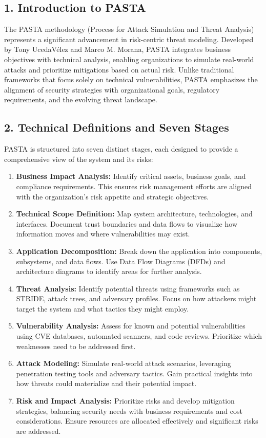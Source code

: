

\subsection*{1. Introduction to PASTA}
The PASTA methodology (Process for Attack Simulation and Threat Analysis) represents a significant advancement in risk-centric threat modeling. Developed by Tony UcedaVélez and Marco M. Morana\cite{uceda2015}, PASTA integrates business objectives with technical analysis, enabling organizations to simulate real-world attacks and prioritize mitigations based on actual risk. Unlike traditional frameworks that focus solely on technical vulnerabilities, PASTA emphasizes the alignment of security strategies with organizational goals, regulatory requirements, and the evolving threat landscape.

\subsection*{2. Technical Definitions and Seven Stages}
PASTA is structured into seven distinct stages, each designed to provide a comprehensive view of the system and its risks:
\begin{enumerate}
	\item \textbf{Business Impact Analysis:} Identify critical assets, business goals, and compliance requirements. This ensures risk management efforts are aligned with the organization’s risk appetite and strategic objectives.
	\item \textbf{Technical Scope Definition:} Map system architecture, technologies, and interfaces. Document trust boundaries and data flows to visualize how information moves and where vulnerabilities may exist.
	\item \textbf{Application Decomposition:} Break down the application into components, subsystems, and data flows. Use Data Flow Diagrams (DFDs) and architecture diagrams to identify areas for further analysis.
	\item \textbf{Threat Analysis:} Identify potential threats using frameworks such as STRIDE, attack trees, and adversary profiles\cite{shostack2014}. Focus on how attackers might target the system and what tactics they might employ.
	\item \textbf{Vulnerability Analysis:} Assess for known and potential vulnerabilities using CVE databases, automated scanners, and code reviews\cite{owasp}. Prioritize which weaknesses need to be addressed first.
	\item \textbf{Attack Modeling:} Simulate real-world attack scenarios, leveraging penetration testing tools and adversary tactics\cite{nist800154}. Gain practical insights into how threats could materialize and their potential impact.
	\item \textbf{Risk and Impact Analysis:} Prioritize risks and develop mitigation strategies, balancing security needs with business requirements and cost considerations\cite{uceda2015}. Ensure resources are allocated effectively and significant risks are addressed.
\end{enumerate}

